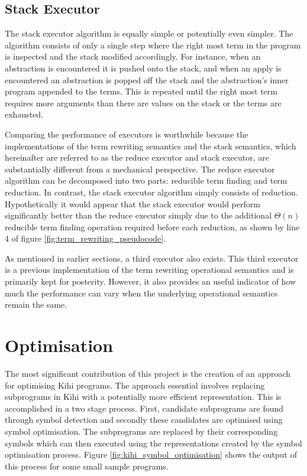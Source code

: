 \subsection{Stack Executor}


The stack executor algorithm is equally simple or potentially even simpler. The algorithm consists of only a single step where the right most term in the program is inspected and the stack modified accordingly. For instance, when an abstraction is encountered it is pushed onto the stack, and when an apply is encountered an abstraction is popped off the stack and the abstraction's inner program appended to the terms. This is repeated until the right most term requires more arguments than there are values on the stack or the terms are exhausted.

Comparing the performance of executors is worthwhile because the implementations of the term rewriting semantics and the stack semantics, which hereinafter are referred to as the reduce executor and stack executor, are substantially different from a mechanical perspective. The reduce executor algorithm can be decomposed into two parts: reducible term finding and term reduction. In contrast, the stack executor algorithm simply consists of reduction.  Hypothetically it would appear that the stack executor would perform significantly better than the reduce executor simply due to the additional $\Theta(n)$ reducible term finding operation required before each reduction, as shown by line 4 of figure \ref{fig:term_rewriting_pseudocode}.

As mentioned in earlier sections, a third executor also exists. This third executor is a previous implementation of the term rewriting operational semantics and is primarily kept for posterity. However, it also provides an useful indicator of how much the performance can vary when the underlying operational semantics remain the same.


\section{Optimisation}\label{sec:implementation_optimisation}




The most significant contribution of this project is the creation of an approach for optimising Kihi programs. The approach essential involves replacing subprograms in Kihi with a potentially more efficient representation. This is accomplished in a two stage process. First, candidate subprograms are found through symbol detection and secondly these candidates are optimised using symbol optimisation. The subprograms are replaced by their corresponding symbols which can then executed using the representations created by the symbol optimisation process. Figure \ref{fig:kihi_symbol_optimisation} shows the output of this process for some small sample programs. 

